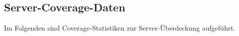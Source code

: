 \FloatBarrier
\subsection{Server-Coverage-Daten}

Im Folgenden sind Coverage-Statistiken zur Server-Überdeckung aufgeführt. 